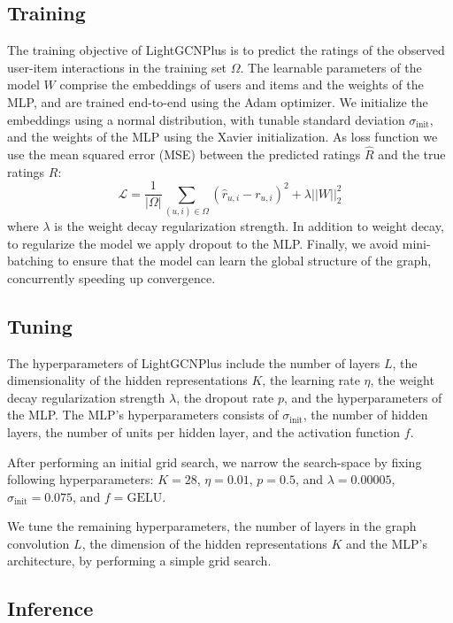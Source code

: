 \documentclass[10pt,conference,compsocconf]{IEEEtran}
\begin{document}
\subsection{Training}
The training objective of LightGCNPlus is to predict the ratings of the observed user-item interactions in the training set $\Omega$.
The learnable parameters of the model $W$ comprise the embeddings of users and items and the weights of the MLP, and are trained end-to-end using the Adam optimizer.
We initialize the embeddings using a normal distribution, with tunable standard deviation $\sigma_{\text{init}}$, and the weights of the MLP using the Xavier initialization.
As loss function we use the mean squared error (MSE) between the predicted ratings $\hat{R}$ and the true ratings $R$:
\begin{equation}
    \mathcal{L} = \frac{1}{|\Omega|} \sum_{(u,i) \in \Omega} (\hat{r}_{u,i} - r_{u,i})^2 + \lambda ||W||_2^2
\end{equation}
where $\lambda$ is the weight decay regularization strength.
In addition to weight decay, to regularize the model we apply dropout to the MLP.
Finally, we avoid mini-batching to ensure that the model can learn the global structure of the graph, concurrently speeding up convergence.

\subsection{Tuning}
The hyperparameters of LightGCNPlus include the number of layers $L$, the dimensionality of the hidden representations $K$, the learning rate $\eta$, the weight decay regularization strength $\lambda$, the dropout rate $p$, and the hyperparameters of the MLP.
The MLP's hyperparameters consists of $\sigma_{\text{init}}$, the number of hidden layers, the number of units per hidden layer, and the activation function $f$.

After performing an initial grid search, we narrow the search-space by fixing following hyperparameters: $K=28$, $\eta=0.01$, $p=0.5$, and $\lambda=0.00005$, $\sigma_{\text{init}}=0.075$, and $f=\text{GELU}$.

We tune the remaining hyperparameters, the number of layers in the graph convolution $L$, the dimension of the hidden representations $K$ and the MLP's architecture, by performing a simple grid search.

\subsection{Inference}
\end{document}
